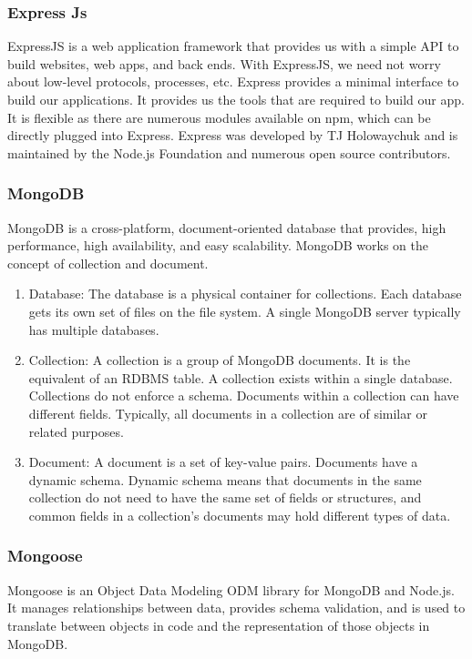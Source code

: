 \subsubsection{Express Js}
ExpressJS is a web application framework that provides us with a simple API to build websites, web apps, and back ends. With ExpressJS, we need not worry about low-level protocols, processes, etc.
Express provides a minimal interface to build our applications. It provides us the tools that are required to build our app. It is flexible as there are numerous modules available on npm, which can be directly plugged into Express.
Express was developed by TJ Holowaychuk and is maintained by the Node.js Foundation and numerous open source contributors.



\subsubsection{MongoDB}
MongoDB is a cross-platform, document-oriented database that provides, high performance, high availability, and easy scalability. MongoDB works on the concept of collection and document.
\begin{enumerate}
      \item
            Database:
            The database is a physical container for collections. Each database gets its own set of files on the file system. A single MongoDB server typically has multiple databases.
      \item
            Collection:
            A collection is a group of MongoDB documents. It is the equivalent of an RDBMS table. A collection exists within a single database. Collections do not enforce a schema. Documents within a collection can have different fields. Typically, all documents in a collection are of similar or related purposes.
      \item
            Document:
            A document is a set of key-value pairs. Documents have a dynamic schema. Dynamic schema means that documents in the same collection do not need to have the same set of fields or structures, and common fields in a collection's documents may hold different types of data.
\end{enumerate}


\subsubsection{Mongoose}
Mongoose is an Object Data Modeling \ac{ODM} library for MongoDB and Node.js. It manages relationships between data, provides schema validation, and is used to translate between objects in code and the representation of those objects in MongoDB.





